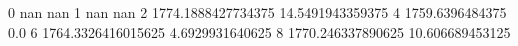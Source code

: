 0 nan nan
1 nan nan
2 1774.1888427734375 14.5491943359375
4 1759.6396484375 0.0
6 1764.3326416015625 4.6929931640625
8 1770.246337890625 10.606689453125
